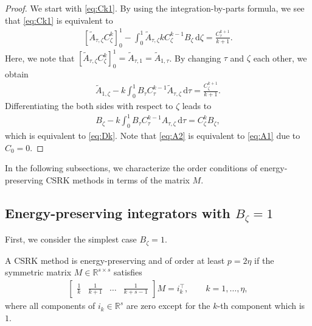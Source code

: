 \documentclass[final,leqno,onefignum,onetabnum]{siamltex1213}
\begin{document}
\begin{proof}
We start with \eqref{eq:Ck1}.
By using the integration-by-parts formula, we see that \eqref{eq:Ck1} is equivalent to
\begin{align*}
\left[ \tilde{A}_{\tau,\zeta} C_\zeta^k \right]_0^1
-\int_0^1 \tilde{A}_{\tau,\zeta} k C_\zeta^{k-1} B_\zeta\,{\mathrm d}\zeta
=
\frac{C_\tau^{k+1}}{k+1}.
\end{align*}
Here, we note that $\left[ \tilde{A}_{\tau,\zeta} C_\zeta^k \right]_0^1
= \tilde{A}_{\tau,1}=\tilde{A}_{1,\tau}$.
By changing $\tau$ and $\zeta$ each other, we obtain
\begin{align}
\tilde{A}_{1,\zeta} - k \int_0^1 B_\tau C_\tau^{k-1} \tilde{A}_{\tau,\zeta}\,{\mathrm d}\tau
=
\frac{C_\zeta^{k+1}}{k+1}.
\label{eq:A2}
\end{align}
Differentiating the both sides with respect to $\zeta$ leads to
\begin{align}
B_\zeta - k \int_0^1 B_\tau C_\tau^{k-1} A_{\tau,\zeta}\,{\mathrm d}\tau
=
C_\zeta^k B_\zeta, 
\label{eq:A1}
\end{align}
which is equivalent to \eqref{eq:Dk}.
Note that \eqref{eq:A2} is equivalent to \eqref{eq:A1} due to $C_0=0$.
\end{proof}

In the following subsections,
we characterize the order conditions of energy-preserving CSRK methods
in terms of the matrix $M$.

\subsection{Energy-preserving integrators with $B_\zeta=1$}
First, we consider the simplest case $B_\zeta =1$.

\begin{theorem}
\label{th:order2k}
A CSRK method is energy-preserving and of order at least $p=2\eta$
if the symmetric matrix $M \in {\mathbb R} ^{s\times s}$ satisfies
\begin{align}
\begin{bmatrix}
\frac{1}{k} & \frac{1}{k+1} & \dots & \frac{1}{k+s-1} 
\end{bmatrix}
M = i_k^\top , \qquad k = 1,\dots,\eta,
\label{eq:cond2k}
\end{align}
where all components of $i_k\in{\mathbb R}^s$ are zero except for the $k$-th component
which is $1$.
\end{theorem}
\end{document}
